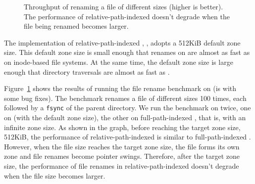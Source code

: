 \begin{figure}[t]
    \centering
    \caption[The performance of file renames in relative-path-indexed file systems]{\label{fig:file_rename_rpi}
        Throughput of renaming a file of different sizes (higher is better).
        The performance of relative-path-indexed \betrfsThree doesn't
        degrade when the file being renamed becomes larger.}
\end{figure}

The implementation of relative-path-indexed \betrfs, \betrfsTwo, adopts a
512KiB default zone size.
This default zone size is small enough that renames on \betrfsTwo are almost
as fast as on inode-based file systems.
At the same time, the default zone size is large enough that directory
traversals are almost as fast as \betrfsOne.

Figure~\ref{fig:file_rename_rpi} shows the results of running the file rename
benchmark on \betrfsThree (\betrfsThree is \betrfsTwo with some bug fixes).
The benchmark renames a file of different sizes 100 times, each followed by a
\texttt{fsync} of the parent directory.
We run the benchmark on \betrfsThree twice,
one on \betrfsThree (with the default zone size),
the other on full-path-indexed \betrfsThree,
that is, \betrfsThree with an infinite zone size.
As shown in the graph, before reaching the target zone size, 512KiB,
the performance of relative-path-indexed \betrfsThree is similar to
full-path-indexed \betrfsThree.
However, when the file size reaches the target zone size, the file forms its
own zone and file renames become pointer swings.
Therefore, after the target zone size,
the performance of file renames in relative-path-indexed \betrfsThree
doesn't degrade when the file size becomes larger.

